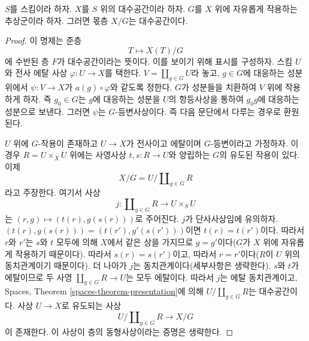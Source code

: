 \begin{lemma}
\label{lemma-quotient}
$S$를 스킴이라 하자.
$X$를 $S$ 위의 대수공간이라 하자.
$G$를 $X$ 위에 자유롭게 작용하는 추상군이라 하자.
그러면 몫층 $X/G$는 대수공간이다.
\end{lemma}

\begin{proof}
이 명제는 준층
$$
T \longmapsto X(T)/G
$$
에 수반된 층 $F$가 대수공간이라는 뜻이다. 이를 보이기 위해 표시를
구성하자. 스킴 $U$와 전사 에탈 사상 $\varphi : U \to X$를 택한다.
$V = \coprod_{g \in G} U$라 놓고, $g \in G$에 대응하는 성분 위에서
$\psi : V \to X$가 $a(g) \circ \varphi$와 같도록 정한다.
$G$가 성분들을 치환하여 $V$ 위에 작용하게 하자. 즉 $g_0 \in G$는
$g$에 대응하는 성분을 $U$의 항등사상을 통하여 $g_0g$에 대응하는 성분으로
보낸다. 그러면 $\psi$는 $G$-등변사상이다. 즉 다음 문단에서 다루는
경우로 환원된다.

\medskip\noindent
$U$ 위에 $G$-작용이 존재하고 $U \to X$가 전사이고 에탈이며
$G$-등변이라고 가정하자. 이 경우 $R = U \times_X U$ 위에는 사영사상
$t, s : R \to U$와 양립하는 $G$의 유도된 작용이 있다. 이제
$$
X/G = U/\coprod\nolimits_{g \in G} R
$$
라고 주장한다. 여기서 사상
$$
j : \coprod\nolimits_{g \in G} R
\longrightarrow
U \times_S U
$$
는 $(r, g) \mapsto (t(r), g(s(r)))$로 주어진다. $j$가 단사사상임에
유의하자. $(t(r), g(s(r))) = (t(r'), g'(s(r')))$이면
$t(r) = t(r')$이다. 따라서 $r$와 $r'$는 $s$와 $t$ 모두에 의해
$X$에서 같은 상을 가지므로 $g = g'$이다($G$가 $X$ 위에 자유롭게
작용하기 때문이다). 따라서 $s(r) = s(r')$이고, 따라서
$r = r'$이다($R$이 $U$ 위의 동치관계이기 때문이다).
더 나아가 $j$는 동치관계이다(세부사항은 생략한다).
$s$와 $t$가 에탈이므로 두 사영
$\coprod\nolimits_{g \in G} R \to U$는 모두 에탈이다. 따라서 $j$는
에탈 동치관계이고, Spaces, Theorem \ref{spaces-theorem-presentation}에 의해
$U/\coprod\nolimits_{g \in G} R$는 대수공간이다. 사상 $U \to X$로
유도되는 사상
$$
U/\coprod\nolimits_{g \in G} R \longrightarrow X/G
$$
이 존재한다. 이 사상이 층의 동형사상이라는 증명은 생략한다.
\end{proof}












